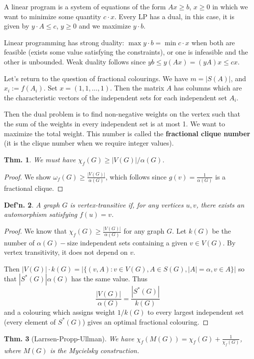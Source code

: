 \documentclass[12pt, a4paper]{book}
\newtheorem{theorem}{Thm.}[section]
\newtheorem{definition}[theorem]{Def'n.}
\theoremstyle{nonumberplain}
\newtheorem{proof}{Proof}
\begin{document}
A linear program is a system of equations of the form $Ax\geq b$, $x\geq 0$ in which we want to minimize some quantity $c\cdot x$.
Every LP has a dual, in this case, it is given by $y\cdot A\leq c$, $y\geq 0$ and we maximize $y\cdot b$.

Linear programming has strong duality: $\max y\cdot b=\min c\cdot x$ when both are feasible (exists some value satisfying the constraints), or one is infeasible and the other is unbounded.
Weak duality follows since $yb\leq y(Ax)=(yA)x\leq cx$.

Let's return to the question of fractional colourings.
We have $m=|S(A)|$, and $x_i:= f(A_i)$.
Set $x=(1,1,\ldots,1)$.
Then the matrix $A$ has columns which are the characteristic vectors of the independent sets for each independent set $A_i$.

Then the dual problem is to find non-negative weights on the vertex such that the sum of the weights in every independent set is at most 1.
We want to maximize the total weight.
This number is called the \textbf{fractional clique number} (it is the clique number when we require integer values).
\begin{theorem}
    We must have $\chi_f(G)\geq|V(G)|/\alpha(G)$.
\end{theorem}
\begin{proof}
    We show $\omega_f(G)\geq\frac{|V(G)|}{\alpha(G)}$, which follows since $g(v)=\frac{1}{\alpha(G)}$ is a fractional clique.
\end{proof}
\begin{definition}
    A graph $G$ is vertex-transitive if, for any vertices $u,v$, there exists an automorphism satisfying $f(u)=v$.
\end{definition}
\begin{proof}
    We know that $\chi_f(G)\geq\frac{|V(G)|}{\alpha(G)}$ for any graph $G$.
    Let $k(G)$ be the number of $\alpha(G)-\text{size}$ independent sets containing a given $v\in V(G)$.
    By vertex transitivity, it does not depend on $v$.

    Then $|V(G)|\cdot k(G)=\left\lvert\{(v,A):v\in V(G),A\in S(G),|A|=\alpha,v\in A\}\right\rvert$ so that $|S^*(G)|\alpha(G)$ has the same value.
    Thus
    \[\frac{|V(G)|}{\alpha(G)}=\frac{|S^*(G)|}{k(G)}\]
    and a colouring which assigns weight $1/k(G)$ to every largest independent set (every element of $S^*(G)$) gives an optimal fractional colouring.
\end{proof}
\begin{theorem}[Larrsen-Propp-Ullman]
    We have $\chi_f(M(G))=\chi_f(G)+\frac{1}{\chi_f(G)}$, where $M(G)$ is the Mycielsky construction.
\end{theorem}
\end{document}

